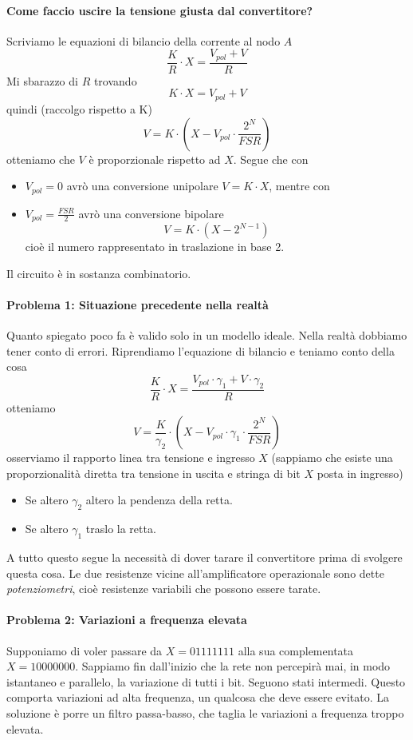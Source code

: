 \documentclass[11pt]{report}
\begin{document}
\paragraph{Come faccio uscire la tensione giusta dal convertitore?} Scriviamo le equazioni di bilancio della corrente al nodo $A$
\[\frac{K}{R} \cdot X = \frac{V_{pol}+V}{R}\]
Mi sbarazzo di $R$ trovando
\[K \cdot X = V_{pol} + V\]
quindi (raccolgo rispetto a K)
\[V=K \cdot \left(X-V_{pol} \cdot \frac{2^N}{FSR}\right)\]
otteniamo che $V$ è proporzionale rispetto ad $X$. Segue che con
\begin{itemize}
\item $V_{pol}=0$ avrò una conversione unipolare $V= K \cdot X$, mentre con
\item $V_{pol}=\frac{FSR}{2}$ avrò una conversione bipolare
\[V=K \cdot (X- 2^{N-1})\]
cioè il numero rappresentato in traslazione in base 2.
\end{itemize}
Il circuito è in sostanza combinatorio. 
\paragraph{Problema 1: Situazione precedente nella realtà} Quanto spiegato poco fa è valido solo in un modello ideale. Nella realtà dobbiamo tener conto di errori. Riprendiamo l'equazione di bilancio e teniamo conto della cosa
\[\frac{K}{R} \cdot X = \frac{V_{pol}\cdot \gamma_1+V \cdot \gamma_2}{R}\]
otteniamo
\[V = \frac{K}{\gamma_2} \cdot \left(X-V_{pol} \cdot \gamma_1 \cdot \frac{2^N}{FSR}\right)\]
osserviamo il rapporto linea tra tensione e ingresso $X$ (sappiamo che esiste una proporzionalità diretta tra tensione in uscita e stringa di bit $X$ posta in ingresso)
\begin{itemize}
\item Se altero $\gamma_2$ altero la pendenza della retta.
\item Se altero $\gamma_1$ traslo la retta.
\end{itemize}
A tutto questo segue la necessità di dover tarare il convertitore prima di svolgere questa cosa. Le due resistenze vicine all'amplificatore operazionale sono dette \emph{potenziometri}, cioè resistenze variabili che possono essere tarate.
\paragraph{Problema 2: Variazioni a frequenza elevata} Supponiamo di voler passare da $X=01111111$ alla sua complementata $X=10000000$. Sappiamo fin dall'inizio che la rete non percepirà mai, in modo istantaneo e parallelo, la variazione di tutti i bit. Seguono stati intermedi. Questo comporta variazioni ad alta frequenza, un qualcosa che deve essere evitato. La soluzione è porre un filtro passa-basso, che taglia le variazioni a frequenza troppo elevata.
\end{document}
